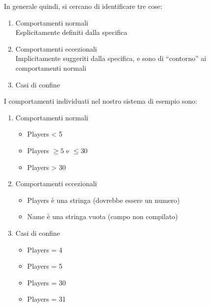 In generale quindi, si cercano di identificare tre cose: \begin{enumerate}
    \item Comportamenti normali \\ Esplicitamente definiti dalla specifica
    \item Comportamenti eccezionali \\ Implicitamente suggeriti dalla specifica, e sono di ``contorno'' ai comportamenti normali
    \item Casi di confine
\end{enumerate}

I comportamenti individuati nel nostro sistema di esempio sono: \begin{enumerate}
    \item Comportamenti normali \begin{itemize}
        \item Players < 5
        \item Players $\geq 5$ e $\leq 30$
        \item Players > 30
    \end{itemize}
    \item Comportamenti eccezionali \begin{itemize}
        \item Players è una stringa (dovrebbe essere un numero)
        \item Name è una stringa vuota (campo non compilato)
    \end{itemize}
    \item Casi di confine \begin{itemize}
        \item Players = 4
        \item Players = 5
        \item Players = 30
        \item Players = 31
    \end{itemize}
\end{enumerate}